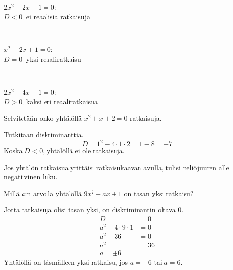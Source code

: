 \begin{esimerkki}
\ \\
\parbox{4.5cm}{
\begin{kuvaajapohja}{1}{-1}{3}{-1}{3}
\end{kuvaajapohja}
}
\parbox{6cm}{$2x^2-2x+1=0$:\\$D < 0$, ei reaalisia ratkaisuja}
\\
\parbox{4.5cm}{
\begin{kuvaajapohja}{1}{-1}{3}{-1}{3}
\end{kuvaajapohja}
}
\parbox{6cm}{$x^2-2x+1=0$:\\$D = 0$, yksi reaaliratkaisu}
\\
\parbox{4.5cm}{
\begin{kuvaajapohja}{1}{-1}{3}{-2}{2}
\end{kuvaajapohja}
}
\parbox{6cm}{$2x^2-4x+1=0$:\\$D > 0$, kaksi eri reaaliratkaisua}
\end{esimerkki}

\begin{esimerkki}
Selvitetään onko yhtälöllä $x^2+x+2=0$ ratkaisuja.

Tutkitaan diskriminanttia.
\[D=1^2-4\cdot 1 \cdot 2 = 1-8 = -7\]
Koska $D<0$, yhtälöllä ei ole ratkaisuja.

Jos yhtälön ratkaisua yrittäisi ratkaisukaavan avulla, tulisi neliöjuuren alle negatiivinen luku.
\end{esimerkki}

\begin{esimerkki}
Millä $a$:n arvolla yhtälöllä $9x^2+ax+1$ on tasan yksi ratkaisu?

Jotta ratkaisuja olisi tasan yksi, on diskriminantin oltava 0.
\begin{align*}
D &=0\\
a^2-4\cdot 9\cdot 1 &= 0\\
a^2-36&=0\\
a^2&=36\\
a=\pm6
\end{align*}
Yhtälöllä on täsmälleen yksi ratkaisu, jos $a=-6$ tai $a=6$.
\end{esimerkki}